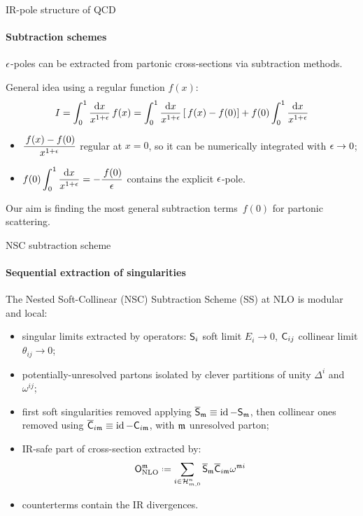 
\begin{frame}{IR-pole structure of QCD}
  \framesubtitle{Subtraction schemes}

  $ \epsilon $-poles can be extracted from partonic cross-sections via subtraction methods.

  General idea using a regular function $ f(x) $:
  \begin{equation*}
    I = \int_0^1 \frac{\mathrm{d} x}{x^{1 + \epsilon}} \,f(x) = \int_0^1 \frac{\mathrm{d} x}{x^{1 + \epsilon}} \left[ \,f(x) - f(0) \right] + f(0) \int_0^1 \frac{\mathrm{d} x}{x^{1 + \epsilon}}
  \end{equation*}
  \begin{itemize}
    \item $ \displaystyle \frac{\,f(x) - f(0)}{x^{1 + \epsilon}} $ regular at $ x = 0 $, so it can be numerically integrated with $ \epsilon \rightarrow 0 $;
    \item $ \displaystyle f(0) \int_0^1 \frac{\mathrm{d} x}{x^{1 + \epsilon}} = - \frac{\,f(0)}{\epsilon} $ contains the explicit $ \epsilon $-pole.
  \end{itemize}

  Our aim is finding the most general subtraction terms $ \,f(0) $ for partonic scattering.

\end{frame}


\begin{frame}{NSC subtraction scheme}
  \framesubtitle{Sequential extraction of singularities}

  \justifying
  The Nested Soft-Collinear (NSC) Subtraction Scheme (SS) at NLO is modular and local:
  \begin{itemize}[<+->]
    \item singular limits extracted by operators: $ \mathsf{S}_i $ soft limit $ E_i \rightarrow 0 $, $ \mathsf{C}_{ij} $ collinear limit $ \theta_{ij} \rightarrow 0 $;
    \item potentially-unresolved partons isolated by clever partitions of unity $ \Delta^i $ and $ \omega^{ij} $;
    \item first soft singularities removed applying $ \overline{\mathsf{S}}_{\mathfrak{m}} \equiv \operatorname{id} - \mathsf{S}_{\mathfrak{m}} $, then collinear ones removed using $ \overline{\mathsf{C}}_{i\mathfrak{m}} \equiv \operatorname{id} - \mathsf{C}_{i\mathfrak{m}} $, with $ \mathfrak{m} $ unresolved parton;
    \item IR-safe part of cross-section extracted by:
      \begin{equation*}
        \nlo^\ur \defeq \sum_{i \in \prt{n}{m}} \oso_\ur \oco_{i\ur} \omega^{\ur i}
      \end{equation*}
    \item counterterms contain the IR divergences.
  \end{itemize}

\end{frame}

